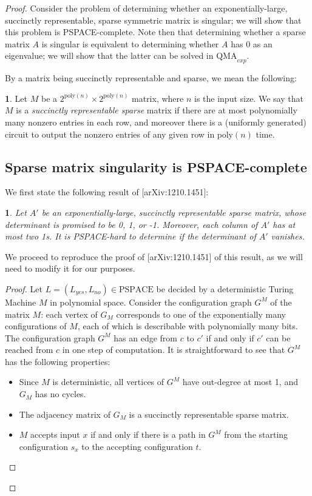 \documentclass[english]{article}
\numberwithin{equation}{section}
\numberwithin{figure}{section}
\theoremstyle{plain}
\theoremstyle{definition}
\newtheorem{defn}[thm]{\protect\definitionname}
\theoremstyle{plain}
\newtheorem{lem}[thm]{\protect\lemmaname}
\theoremstyle{definition}
\theoremstyle{remark}
\theoremstyle{remark}
\theoremstyle{plain}
\providecommand{\definitionname}{Definition}
\providecommand{\lemmaname}{Lemma}
\begin{document}
\begin{proof}

Consider the problem of determining whether an exponentially-large, succinctly representable, sparse symmetric matrix is singular; we will show that this problem is PSPACE-complete. Note then that determining whether a sparse matrix $A$ is singular is equivalent to determining whether $A$ has 0 as an eigenvalue; we will show that the latter can be solved in $\text{QMA}_{exp}$.

By a matrix being succinctly representable and sparse, we mean the following:
\begin{defn}
Let $M$ be a $2^{\text{poly}(n)} \times 2^{\text{poly}(n)}$ matrix, where $n$ is the input size. We say that $M$ is a \emph{succinctly representable sparse} matrix if there are at most polynomially many nonzero entries in each row, and moreover there is a (uniformly generated) circuit to output the nonzero entries of any given row in $\text{poly}(n)$ time.
\end{defn}

\subsection{Sparse matrix singularity is PSPACE-complete}

We first state the following result of [arXiv:1210.1451]:
\begin{lem}
Let $A'$ be an exponentially-large, succinctly representable sparse matrix, whose determinant is promised to be 0, 1, or -1. Moreover, each column of $A'$ has at most two 1s. It is PSPACE-hard to determine if the determinant of $A'$ vanishes.
\end{lem}

We proceed to reproduce the proof of [arXiv:1210.1451] of this result, as we will need to modify it for our purposes.

\begin{proof}
Let $L=(L_{yes},L_{no}) \in \text{PSPACE}$ be decided by a deterministic Turing Machine $M$ in polynomial space. Consider the configuration graph $G^M$ of the matrix $M$: each vertex of $G_M$ corresponds to one of the exponentially many configurations of $M$, each of which is describable with polynomially many bits. The configuration graph $G^M$ has an edge from $c$ to $c'$ if and only if $c'$ can be reached from $c$ in one step of computation. It is straightforward to see that $G^M$ has the following properties:
\begin{itemize}
\item Since $M$ is deterministic, all vertices of $G^M$ have out-degree at most 1, and $G_M$ has no cycles.
\item The adjacency matrix of $G_M$ is a succinctly representable sparse matrix.
\item $M$ accepts input $x$ if and only if there is a path in $G^M$ from the starting configuration $s_x$ to the accepting configuration $t$.
\end{itemize}


\end{proof}
\end{proof}
\end{document}
